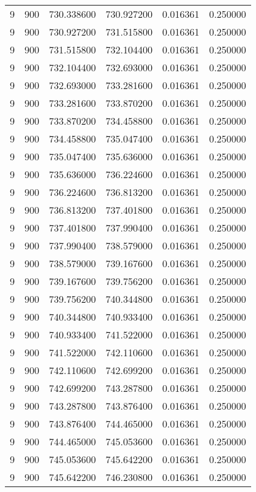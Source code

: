 \begin{longtable}{rrrrrr}
9 & 900 & 730.338600 & 730.927200 & 0.016361 & 0.250000 \\
9 & 900 & 730.927200 & 731.515800 & 0.016361 & 0.250000 \\
9 & 900 & 731.515800 & 732.104400 & 0.016361 & 0.250000 \\
9 & 900 & 732.104400 & 732.693000 & 0.016361 & 0.250000 \\
9 & 900 & 732.693000 & 733.281600 & 0.016361 & 0.250000 \\
9 & 900 & 733.281600 & 733.870200 & 0.016361 & 0.250000 \\
9 & 900 & 733.870200 & 734.458800 & 0.016361 & 0.250000 \\
9 & 900 & 734.458800 & 735.047400 & 0.016361 & 0.250000 \\
9 & 900 & 735.047400 & 735.636000 & 0.016361 & 0.250000 \\
9 & 900 & 735.636000 & 736.224600 & 0.016361 & 0.250000 \\
9 & 900 & 736.224600 & 736.813200 & 0.016361 & 0.250000 \\
9 & 900 & 736.813200 & 737.401800 & 0.016361 & 0.250000 \\
9 & 900 & 737.401800 & 737.990400 & 0.016361 & 0.250000 \\
9 & 900 & 737.990400 & 738.579000 & 0.016361 & 0.250000 \\
9 & 900 & 738.579000 & 739.167600 & 0.016361 & 0.250000 \\
9 & 900 & 739.167600 & 739.756200 & 0.016361 & 0.250000 \\
9 & 900 & 739.756200 & 740.344800 & 0.016361 & 0.250000 \\
9 & 900 & 740.344800 & 740.933400 & 0.016361 & 0.250000 \\
9 & 900 & 740.933400 & 741.522000 & 0.016361 & 0.250000 \\
9 & 900 & 741.522000 & 742.110600 & 0.016361 & 0.250000 \\
9 & 900 & 742.110600 & 742.699200 & 0.016361 & 0.250000 \\
9 & 900 & 742.699200 & 743.287800 & 0.016361 & 0.250000 \\
9 & 900 & 743.287800 & 743.876400 & 0.016361 & 0.250000 \\
9 & 900 & 743.876400 & 744.465000 & 0.016361 & 0.250000 \\
9 & 900 & 744.465000 & 745.053600 & 0.016361 & 0.250000 \\
9 & 900 & 745.053600 & 745.642200 & 0.016361 & 0.250000 \\
9 & 900 & 745.642200 & 746.230800 & 0.016361 & 0.250000 \\

\end{longtable}
